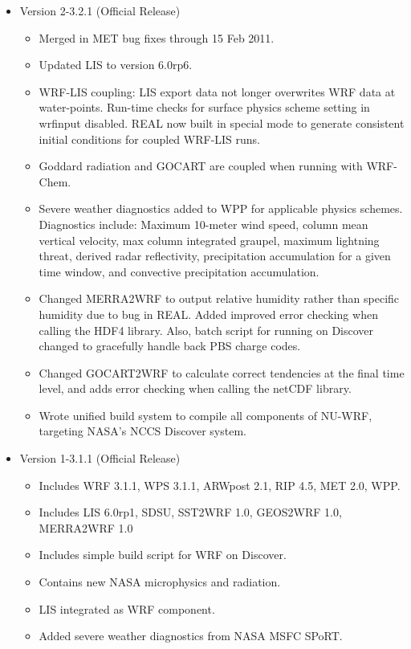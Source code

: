 \begin{itemize}
\item Version 2-3.2.1 (Official Release)
  \begin{itemize}
  \item Merged in MET bug fixes through 15 Feb 2011.
  \item Updated LIS to version 6.0rp6.
  \item WRF-LIS coupling: LIS export data not longer overwrites WRF data at
    water-points. Run-time checks for surface physics scheme setting in
    wrfinput disabled. REAL now built in special mode to generate consistent
    initial conditions for coupled WRF-LIS runs.
  \item Goddard radiation and GOCART are coupled when running with WRF-Chem.
  \item Severe weather diagnostics added to WPP for applicable physics schemes.
    Diagnostics include: Maximum 10-meter wind speed, column mean vertical
    velocity, max column integrated graupel, maximum lightning threat,
    derived radar reflectivity, precipitation accumulation for a given time
    window, and convective precipitation accumulation.
  \item Changed MERRA2WRF to output relative humidity rather than specific
    humidity due to bug in REAL. Added improved error checking when calling
    the HDF4 library. Also, batch script for running on Discover changed to
    gracefully handle back PBS charge codes.
  \item Changed GOCART2WRF to calculate correct tendencies at the final time
    level, and adds error checking when calling the netCDF library.
  \item Wrote unified build system to compile all components of NU-WRF,
    targeting NASA's NCCS Discover system.
  \end{itemize}

\item Version 1-3.1.1 (Official Release)
  \begin{itemize}
  \item Includes WRF 3.1.1, WPS 3.1.1, ARWpost 2.1, RIP 4.5, MET 2.0, WPP.
  \item Includes LIS 6.0rp1, SDSU, SST2WRF 1.0, GEOS2WRF 1.0, MERRA2WRF 1.0
  \item Includes simple build script for WRF on Discover.
  \item Contains new NASA microphysics and radiation.
  \item LIS integrated as WRF component.
  \item Added severe weather diagnostics from NASA MSFC SPoRT.
  \end{itemize}
  
\end{itemize}